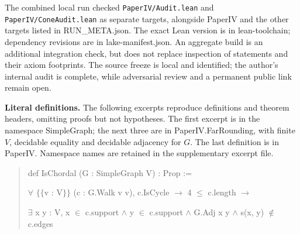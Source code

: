 \documentclass[english,11pt,a4paper]{article}
\begin{document}
The combined local run checked \nolinkurl{PaperIV/Audit.lean} and \nolinkurl{PaperIV/ConeAudit.lean} as separate targets, alongside {\ttfamily\small PaperIV} and the other targets listed in {\ttfamily\small RUN\_\discretionary{\hbox{\ensuremath{\hookrightarrow}}}{}{}META.\discretionary{\hbox{\ensuremath{\hookrightarrow}}}{}{}json}. The exact Lean version is in {\ttfamily\small lean-\discretionary{\hbox{\ensuremath{\hookrightarrow}}}{}{}toolchain}; dependency revisions are in {\ttfamily\small lake-\discretionary{\hbox{\ensuremath{\hookrightarrow}}}{}{}manifest.\discretionary{\hbox{\ensuremath{\hookrightarrow}}}{}{}json}. An aggregate build is an additional integration check, but does not replace inspection of statements and their axiom footprints. The source freeze is local and identified; the author's internal audit is complete, while adversarial review and a permanent public link remain open.

\textbf{Literal definitions.} The following excerpts reproduce definitions and theorem headers, omitting proofs but not hypotheses. The first excerpt is in the namespace {\ttfamily\small SimpleGraph}; the next three are in {\ttfamily\small PaperIV.\discretionary{\hbox{\ensuremath{\hookrightarrow}}}{}{}FarRounding}, with finite \(V\), decidable equality and decidable adjacency for \(G\). The last definition is in {\ttfamily\small PaperIV}. Namespace names are retained in the supplementary excerpt file.

\begin{quote}\footnotesize\ttfamily\raggedright
def IsChordal (G : SimpleGraph V) : Prop :=\par
  \(\forall\) \(\{\!\{\)v : V\(\}\!\}\) (c : G.Walk v v), c.IsCycle \(\to\) 4 \(\le\) c.length \(\to\)\par
    \(\exists\) x y : V, x \(\in\) c.support \(\land\) y \(\in\) c.support \(\land\) G.Adj x y \(\land\) s(x, y) \(\notin\) c.edges\par
\end{quote}
\end{document}
